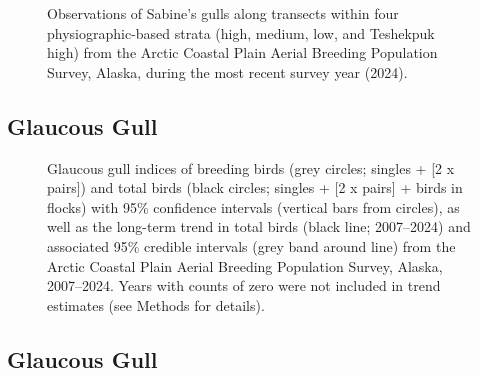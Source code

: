 \documentclass[
]{article}
\begin{document}
\begin{figure}


\caption{\label{fig-SAGUmap}Observations of Sabine's gulls along
transects within four physiographic-based strata (high, medium, low, and
Teshekpuk high) from the Arctic Coastal Plain Aerial Breeding Population
Survey, Alaska, during the most recent survey year (2024).}

\end{figure}%

\newpage{}

\subsection*{Glaucous Gull}\label{glaucous-gull}

\begin{figure}


\caption{\label{fig-GLGU}Glaucous gull indices of breeding birds (grey
circles; singles + {[}2 x pairs{]}) and total birds (black circles;
singles + {[}2 x pairs{]} + birds in flocks) with 95\% confidence
intervals (vertical bars from circles), as well as the long-term trend
in total birds (black line; 2007--2024) and associated 95\% credible
intervals (grey band around line) from the Arctic Coastal Plain Aerial
Breeding Population Survey, Alaska, 2007--2024. Years with counts of
zero were not included in trend estimates (see Methods for details).}

\end{figure}%

\newpage{}

\subsection*{Glaucous Gull}\label{glaucous-gull-1}

\begingroup\fontsize{10}{12}\selectfont
\end{document}

